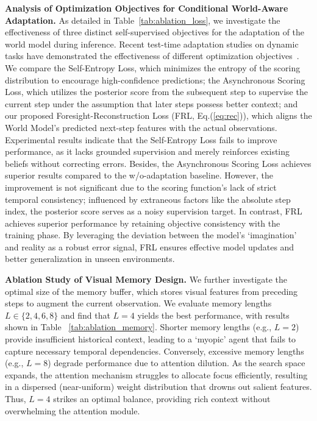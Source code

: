 \documentclass{article}
\theoremstyle{plain}
\theoremstyle{definition}
\theoremstyle{remark}
\begin{document}
\noindent\textbf{Analysis of Optimization Objectives for Conditional World-Aware Adaptation.}
As detailed in Table~\ref{tab:ablation_loss}, we investigate the effectiveness of three distinct self-supervised objectives for the adaptation of the world model during inference. 
Recent test-time adaptation studies on dynamic tasks have demonstrated the effectiveness of different optimization objectives~\citep{guo2026dual,gao2025unity}. 
We compare the Self-Entropy Loss, which minimizes the entropy of the scoring distribution to encourage high-confidence predictions; the Asynchronous Scoring Loss, which utilizes the posterior score from the subsequent step to supervise the current step under the assumption that later steps possess better context; and our proposed Foresight-Reconstruction Loss (FRL, Eq.(\ref{eq:rec})), which aligns the World Model's predicted next-step features with the actual observations. Experimental results indicate that the Self-Entropy Loss fails to improve performance, as it lacks grounded supervision and merely reinforces existing beliefs without correcting errors. Besides, the Asynchronous Scoring Loss achieves superior results compared to the w/o-adaptation baseline. However, the improvement is not significant due to the scoring function's lack of strict temporal consistency; influenced by extraneous factors like the absolute step index, the posterior score serves as a noisy supervision target. In contrast, FRL achieves superior performance by retaining objective consistency with the training phase. By leveraging the deviation between the model's `imagination' and reality as a robust error signal, FRL ensures effective model updates and better generalization in unseen environments.



\noindent\textbf{Ablation Study of Visual Memory Design.}
We further investigate the optimal size of the memory buffer, which stores visual features from preceding steps to augment the current observation. We evaluate memory lengths $L \in \{2, 4, 6, 8\}$ and find that $L=4$ yields the best performance, with results shown in Table ~\ref{tab:ablation_memory}. Shorter memory lengths (e.g., $L=2$) provide insufficient historical context, leading to a `myopic' agent that fails to capture necessary temporal dependencies. Conversely, excessive memory lengths (e.g., $L=8$) degrade performance due to attention dilution. As the search space expands, the attention mechanism struggles to allocate focus efficiently, resulting in a dispersed (near-uniform) weight distribution that drowns out salient features. Thus, $L=4$ strikes an optimal balance, providing rich context without overwhelming the attention module.
\end{document}
